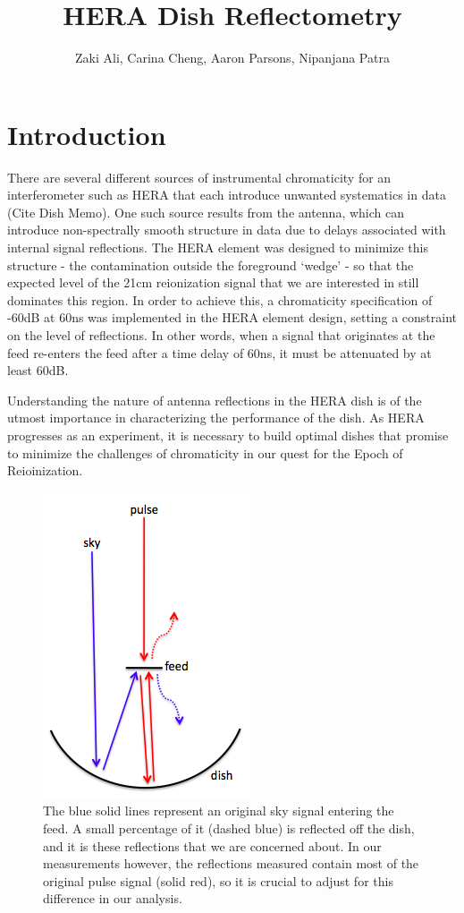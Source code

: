 \documentclass[12pt,preprint]{aastex}
\begin{document}
\title{HERA Dish Reflectometry} 
\author{Zaki Ali, Carina Cheng, Aaron Parsons, Nipanjana Patra}
\maketitle

\section{Introduction}

There are several different sources of instrumental chromaticity for an
interferometer such as HERA that each introduce unwanted systematics in data
(Cite Dish Memo). One such source results from the antenna, which can introduce
non-spectrally smooth structure in data due to delays associated with internal
signal reflections. The HERA element was designed to minimize this structure -
the contamination outside the foreground `wedge' - so that the expected level
of the 21cm reionization signal that we are interested in still dominates this
region. In order to achieve this, a chromaticity specification of -60dB at 60ns
was implemented in the HERA element design, setting a constraint on the level
of reflections. In other words, when a signal that originates at the feed
re-enters the feed after a time delay of 60ns, it must be attenuated by at
least 60dB. 

Understanding the nature of antenna reflections in the HERA dish is of the
utmost importance in characterizing the performance of the dish. As HERA
progresses as an experiment, it is necessary to build optimal dishes that
promise to minimize the challenges of chromaticity in our quest for the Epoch
of Reioinization.

\begin{figure}
\centering
\includegraphics[totalheight=0.3\textheight]{plots/reflection_cartoon.png}
\caption{The blue solid lines represent an original sky signal entering the feed. A small percentage of it (dashed blue) is reflected off the dish, and it is these reflections that we are concerned about. In our measurements however, the reflections measured contain most of the original pulse signal (solid red), so it is crucial to adjust for this difference in our analysis.}
\label{fig:cartoon}
\end{figure}
\end{document}
